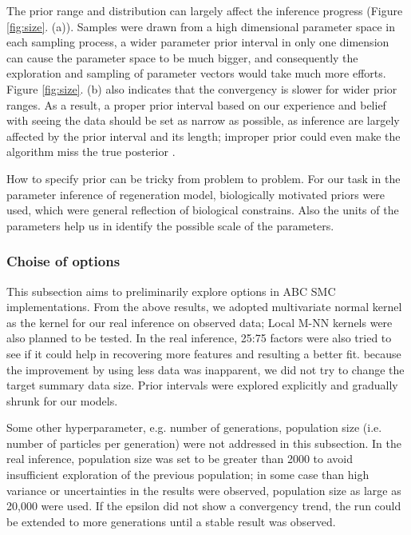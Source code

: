 The prior range and distribution can largely affect the inference progress (Figure \ref{fig:size}. (a)). Samples were drawn from a high dimensional parameter space in each sampling process, a wider parameter prior interval in only one dimension can cause the parameter space to be much bigger, and consequently the exploration and sampling of parameter vectors would take much more efforts. Figure \ref{fig:size}. (b) also indicates that the convergency is slower for wider prior ranges. As a result, a proper prior interval based on our experience and belief with seeing the data should be set as narrow as possible, as inference are largely affected by the prior interval and its length; improper prior could even make the algorithm miss the true posterior \cite{ref:abcsysbio}.

How to specify prior can be tricky from problem to problem. For our task in the parameter inference of regeneration model, biologically motivated priors were used, which were general reflection of biological constrains. Also the units of the parameters help us in identify the possible scale of the parameters.






\subsubsection{Choise of options} 

This subsection aims to preliminarily explore options in ABC SMC implementations. From the above results, we adopted multivariate normal kernel as the kernel for our real inference on observed data; Local M-NN kernels were also planned to be tested. In the real inference, 25:75 factors were also tried to see if it could help in recovering more features and resulting a better fit. because the improvement by using less data was inapparent, we did not try to change the target summary data size. Prior intervals were explored explicitly and gradually shrunk for our models.

Some other hyperparameter, e.g. number of generations, population size (i.e. number of particles per generation) were not addressed in this subsection. In the real inference, population size was set to be greater than 2000 to avoid insufficient exploration of the previous population; in some case than high variance or uncertainties in the results were observed, population size as large as 20,000 were used. If the epsilon did not show a convergency trend, the run could be extended to more generations until a stable result was observed.

